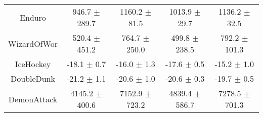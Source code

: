 \begin{table}[H]
{\begin{tabular}{ccccc}
Enduro        &     946.7 $\pm$ 289.7 &     1160.2 $\pm$ 81.5 &     1013.9 $\pm$ 29.7 &     1136.2 $\pm$ 32.5 \\
WizardOfWor   &     520.4 $\pm$ 451.2 &     764.7 $\pm$ 250.0 &     499.8 $\pm$ 238.5 &     792.2 $\pm$ 101.3 \\
IceHockey     &       -18.1 $\pm$ 0.7 &       -16.0 $\pm$ 1.3 &       -17.6 $\pm$ 0.5 &       -15.2 $\pm$ 1.0 \\
DoubleDunk    &       -21.2 $\pm$ 1.1 &       -20.6 $\pm$ 1.0 &       -20.6 $\pm$ 0.3 &       -19.7 $\pm$ 0.5 \\
DemonAttack   &    4145.2 $\pm$ 400.6 &    7152.9 $\pm$ 723.2 &    4839.4 $\pm$ 586.7 &    7278.5 $\pm$ 701.3 \\
\bottomrule
\end{tabular}}
\end{table}

